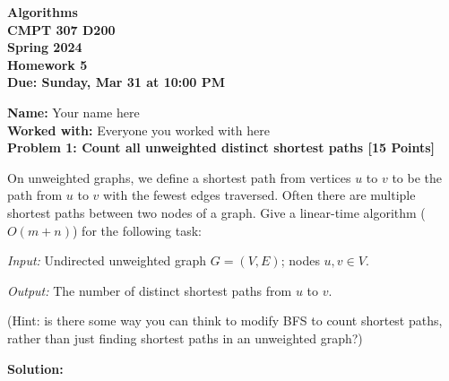 \documentclass[12pt]{article}
\newcommand{\Name}[1]{\noindent \textbf{Name:} #1 \\}
\newcommand{\Workedwith}[1]{\noindent \textbf{Worked with:} #1 \\}
\newcommand{\Problem}[3]{\mbox{} \newline \noindent \textbf{\textbf{Problem #1: #2 [#3 Points] \\ }}}
\begin{document}
\begin{center}
  \bf
  Algorithms \\
  CMPT 307 D200 \\
  Spring 2024 \\
  \rm
  Homework 5\\
  Due:  Sunday, Mar 31 at 10:00 PM \\
\end{center}

\Name{Your name here}
\Workedwith{Everyone you worked with here}

\Problem{1}{Count all unweighted distinct shortest paths}{15}

On unweighted graphs, we define a shortest path from vertices $u$ to $v$ to be the path from $u$ to $v$ with the fewest edges traversed.
Often there are multiple shortest paths between two nodes of a graph. Give a linear-time algorithm ($O(m + n)$) for the following task:

\textit{Input:} Undirected unweighted graph $G = (V, E)$; nodes $u, v \in V$.

\textit{Output:} The number of distinct shortest paths from $u$ to $v$.

(Hint: is there some way you can think to modify BFS to count shortest paths, rather than just finding shortest paths in an unweighted graph?)

\textbf{Solution:}
\end{document}
